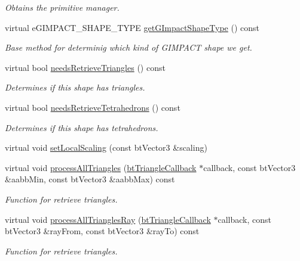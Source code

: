 \begin{CompactItemize}
\begin{CompactList}\small\item\em Obtains the primitive manager. \item\end{CompactList}\item 
virtual eGIMPACT\_\-SHAPE\_\-TYPE \hyperlink{classbt_g_impact_mesh_shape_part_5ff615b55a2bdaeba511fb116a9ab546}{getGImpactShapeType} () const 
\begin{CompactList}\small\item\em Base method for determinig which kind of GIMPACT shape we get. \item\end{CompactList}\item 
\hypertarget{classbt_g_impact_mesh_shape_part_b29d963a06904f28296e28490bdc6bc4}{
virtual bool \hyperlink{classbt_g_impact_mesh_shape_part_b29d963a06904f28296e28490bdc6bc4}{needsRetrieveTriangles} () const }
\label{classbt_g_impact_mesh_shape_part_b29d963a06904f28296e28490bdc6bc4}

\begin{CompactList}\small\item\em Determines if this shape has triangles. \item\end{CompactList}\item 
\hypertarget{classbt_g_impact_mesh_shape_part_5038802356d83b4897a8d92e9214bbe4}{
virtual bool \hyperlink{classbt_g_impact_mesh_shape_part_5038802356d83b4897a8d92e9214bbe4}{needsRetrieveTetrahedrons} () const }
\label{classbt_g_impact_mesh_shape_part_5038802356d83b4897a8d92e9214bbe4}

\begin{CompactList}\small\item\em Determines if this shape has tetrahedrons. \item\end{CompactList}\item 
virtual void \hyperlink{classbt_g_impact_mesh_shape_part_2c1de297d020a75e1ab0f10f7c71478f}{setLocalScaling} (const btVector3 \&scaling)
\item 
virtual void \hyperlink{classbt_g_impact_mesh_shape_part_230a814ad9f784638e8bcbf0592cdd39}{processAllTriangles} (\hyperlink{classbt_triangle_callback}{btTriangleCallback} $\ast$callback, const btVector3 \&aabbMin, const btVector3 \&aabbMax) const 
\begin{CompactList}\small\item\em Function for retrieve triangles. \item\end{CompactList}\item 
virtual void \hyperlink{classbt_g_impact_mesh_shape_part_0e35b55bd50911911f8164cf3a2dd5c8}{processAllTrianglesRay} (\hyperlink{classbt_triangle_callback}{btTriangleCallback} $\ast$callback, const btVector3 \&rayFrom, const btVector3 \&rayTo) const 
\begin{CompactList}\small\item\em Function for retrieve triangles. \item\end{CompactList}\end{CompactItemize}
